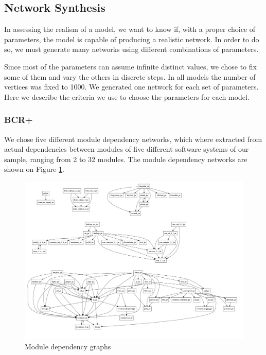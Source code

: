 
\subsection{Network Synthesis}

In assessing the realism of a model, we want to know if, with a proper choice of
parameters, the model is capable of producing a realistic network. In order to
do so, we must generate many networks using different combinations of
parameters. 

Since most of the parameters can assume infinite distinct values, we chose to
fix some of them and vary the others in discrete steps. In all models the number
of vertices was fixed to 1000. We generated one network for each set of
parameters. Here we describe the criteria we use to choose the parameters for
each model.

\subsubsection{BCR+}

We chose five different module dependency networks, which where extracted from
actual dependencies between modules of five different software systems of our
sample, ranging from 2 to 32 modules. The module dependency networks are shown
on Figure \ref{fig:architectures}. 

\begin{figure}[!t]
\centering
\includegraphics[width=1.0\textwidth]{architectures}
\caption{Module dependency graphs}
\label{fig:architectures}
\end{figure}

